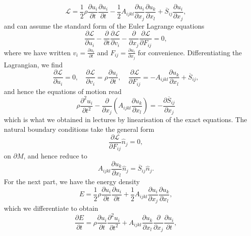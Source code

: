 \documentclass[a4paper,10pt]{paper}
\begin{document}
\begin{enumerate}
\begin{equation*}
    \mathcal{L}=\frac{1}{2}\rho\frac{\partial u_{i}}{\partial t}\frac{\partial u_{i}}{\partial t}-\frac{1}{2}A_{ijkl}\frac{\partial u_{i}}{\partial x_{j}}\frac{\partial u_{k}}{\partial x_{l}}+\overline{S}_{ij}\frac{\partial u_{i}}{\partial x_{j}},
\end{equation*}
and can assume the standard form of the Euler Lagrange equations
\begin{equation*}
    \frac{\partial\mathcal{L}}{\partial u_{i}}-\frac{\partial}{\partial t}\frac{\partial\mathcal{L}}{\partial v_{i}}-\frac{\partial}{\partial x_{j}}\frac{\partial\mathcal{L}}{\partial F_{ij}}=0,
\end{equation*}
where we have written $v_{i}=\frac{\partial u_{i}}{\partial t}$ and $F_{ij}=\frac{\partial u_{i}}{\partial x_{j}}$ for convenience. Differentiating the Lagrangian, we find
\begin{equation*}
    \frac{\partial\mathcal{L}}{\partial u_{i}}=0, \quad \frac{\partial\mathcal{L}}{\partial v_{i}}=\rho\frac{\partial u_{i}}{\partial t}, \quad \frac{\partial\mathcal{L}}{\partial F_{ij}}=-A_{ijkl}\frac{\partial u_{k}}{\partial x_{l}}+\overline{S}_{ij},
\end{equation*}
and hence the equations of motion read
\begin{equation*}
    \rho\frac{\partial^{2}u_{i}}{\partial t^{2}}-\frac{\partial}{\partial x_{j}}(A_{ijkl}\frac{\partial u_{k}}{\partial x_{l}})=-\frac{\partial\overline{S}_{ij}}{\partial x_{j}}
\end{equation*}
which is what we obtained in lectures by linearisation of the exact equations. The natural boundary conditions take the general form
\begin{equation*}
    \frac{\partial\mathcal{L}}{\partial F_{ij}}\hat{n}_{j}=0,
\end{equation*}
on $\partial M$, and hence reduce to
\begin{equation*}
    A_{ijkl}\frac{\partial u_{k}}{\partial x_{l}}\hat{n}_{j}=\overline{S}_{ij}\hat{n}_{j}.
\end{equation*}
For the next part, we have the energy density
\begin{equation*}
    E=\frac{1}{2}\rho\frac{\partial u_{i}}{\partial t}\frac{\partial u_{i}}{\partial t}+\frac{1}{2}A_{ijkl}\frac{\partial u_{i}}{\partial x_{j}}\frac{\partial u_{k}}{\partial x_{l}},
\end{equation*}
which we differentiate to obtain
\begin{equation*}
    \frac{\partial E}{\partial t}=\rho\frac{\partial u_{i}}{\partial t}\frac{\partial^{2}u_{i}}{\partial t^{2}}+A_{ijkl}\frac{\partial u_{k}}{\partial x_{l}}\frac{\partial}{\partial x_{j}}\frac{\partial u_{i}}{\partial t},

\end{equation*}
\end{enumerate}
\end{document}
